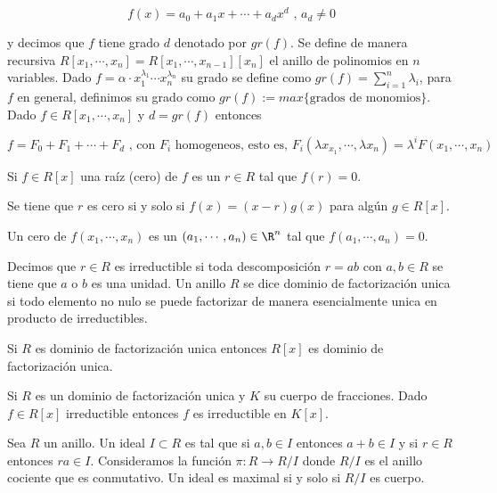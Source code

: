 \documentclass{article}
\begin{document}
\begin{equation*}
    f(x)=a_{0}+a_{1}x+\cdots+a_{d}x^{d}\text{ , }a_{d}\neq0
\end{equation*}

\noindent y decimos que $f$ tiene grado $d$ denotado por $gr(f)$. Se define de manera recursiva
$R[x_{1},\cdots,x_{n}]=R[x_{1},\cdots,x_{n-1}][x_{n}]$ el anillo de polinomios en $n$ variables.
Dado $f=\alpha\cdot x_{1}^{\lambda_{1}}\cdots x_{n}^{\lambda_{n}}$ su grado se define como 
$gr(f)=\sum_{i=1}^{n}\lambda_{i}$, para $f$ en general, definimos su grado como 
$gr(f):=max\{\text{grados de monomios}\}$. Dado $f\in R[x_{1},\cdots,x_{n}]$ y $d=gr(f)$ entonces

\begin{equation*}
    f=F_{0}+F_{1}+\cdots+F_{d}\text{ , con }F_{i}\text{ homogeneos, esto es, }
    F_{i}(\lambda x_{x_{1}},\cdots,\lambda x_{n})=\lambda^{i}F(x_{1},\cdots,x_{n})
\end{equation*}

\noindent Si $f\in R[x]$ una raíz (cero) de $f$ es un $r\in R$ tal que $f(r)=0$.

\begin{teo}
    Se tiene que $r$ es cero si y solo si $f(x)=(x-r)g(x)$ para algún $g\in R[x]$.
\end{teo}

\noindent Un cero de $f(x_{1},\cdots,x_{n})$ es un $(a_{1},\cdots,a_{n})\in\R^{n}$ tal que 
$f(a_{1},\cdots,a_{n})=0$.
\vspace{4mm}

\noindent Decimos que $r\in R$ es irreductible si toda descomposición $r=ab$ con $a,b\in R$ se 
tiene que $a$ o $b$ es una unidad. Un anillo $R$ se dice dominio de factorización unica si todo 
elemento no nulo se puede factorizar de manera esencialmente unica en producto de irreductibles.

\begin{lema}
    Si $R$ es dominio de factorización unica entonces $R[x]$ es dominio de factorización unica.
\end{lema}

\begin{lema}
    Si $R$ es un dominio de factorización unica y $K$ su cuerpo de fracciones. 
Dado $f\in R[x]$ irreductible entonces $f$ es irreductible en $K[x]$.
\end{lema}

\noindent Sea $R$ un anillo. Un ideal $I\subset R$ es tal que si $a,b\in I$ entonces $a+b\in I$ y
si $r\in R$ entonces $ra\in I$. Consideramos la función $\pi:R\to R/I$ donde $R/I$ es el anillo 
cociente que es conmutativo. Un ideal es maximal si y solo si $R/I$ es cuerpo.
\end{document}
